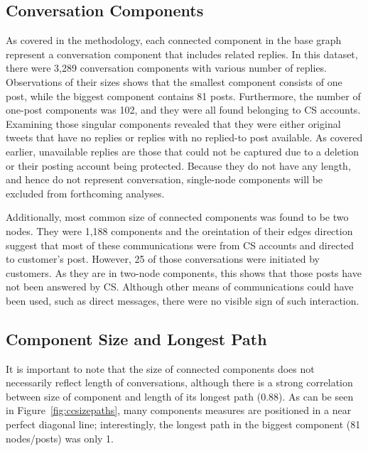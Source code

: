 \documentclass[sigconf]{acmart}
\begin{document}
{\subsection{Conversation Components}

As covered in the methodology, each connected component in the
base graph represent a conversation component that includes related
replies. In this dataset, there were 3,289 conversation components
with various number of replies. Observations of their sizes shows that
the smallest component consists of one post, while the biggest
component contains 81 posts.  Furthermore, the number of one-post
components was 102, and they were all found belonging to CS
accounts. Examining those singular components revealed that they were
either original tweets that have no replies or replies with no
replied-to post available. As covered earlier, unavailable replies are
those that could not be captured due to a deletion or their posting
account being protected. Because they do not have any length, and
hence do not represent conversation, single-node
components will be excluded from forthcoming analyses.

Additionally, most common size of connected components was found to be
two nodes.  They were 1,188 components and the oreintation of their
edges direction suggest that most of these communications were from CS accounts
and directed to customer's post. However, 25 of those conversations
were initiated by customers.  As they are in two-node components, this
shows that those posts have not been answered by CS. Although other
means of communications could have been used, such as direct messages,
there were no visible sign of such interaction.


\subsection{Component Size and Longest Path}

It is important to note that the size of connected components does not
necessarily reflect length of conversations, although there is a
strong correlation between size of component and length of its longest
path (0.88). As can be seen in Figure~\ref{fig:ccsizepaths}, many
components measures are positioned in a near perfect diagonal line;
interestingly, the longest path in the biggest component (81
nodes/posts) was only 1.

}
\end{document}

